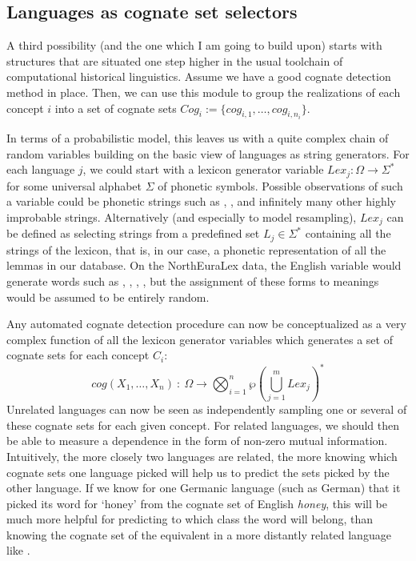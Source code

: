 \subsection{Languages as cognate set selectors}
A third possibility (and the one which I am going to build upon) starts with structures that are situated one step higher in the usual toolchain of computational historical linguistics. Assume we have a good cognate detection method in place. Then, we can use this module to group the realizations of each concept $i$ into a set of cognate sets $Cog_i := \{cog_{i,1}, \dots, cog_{i,n_{i}}\}$.

In terms of a probabilistic model, this leaves us with a quite complex chain of random variables building on the basic view of languages as string generators. For each language $j$, we could start with a lexicon generator variable $Lex_j \colon \Omega \rightarrow \Sigma^*$ for some universal alphabet $\Sigma$ of phonetic symbols. Possible observations of such a variable could be phonetic strings such as \UIPA{[æææ]}, \UIPA{[ktkəəŋ]}, and infinitely many other highly improbable strings. Alternatively (and especially to model resampling), $Lex_j$ can be defined as selecting strings from a predefined set $L_j \in \Sigma^*$ containing all the strings of the lexicon, that is, in our case, a phonetic representation of all the lemmas in our database. On the NorthEuraLex data, the English variable would generate words such as \UIPA{[taʊn]}, \UIPA{[fiːvə]}, \UIPA{[hɛvɪ]}, \UIPA{[aɪ]}, but the assignment of these forms to meanings would be assumed to be entirely random.

Any automated cognate detection procedure can now be conceptualized as a very complex function of all the lexicon generator variables which generates a set of cognate sets for each concept $C_i$:
\begin{equation}
 cog(X_1,\dots,X_n)\ \colon\ \Omega \rightarrow \bigotimes_{i = 1}^{n} \wp\left(\bigcup_{j=1}^{m} Lex_j\right)^*
\end{equation}
Unrelated languages can now be seen as independently sampling one or several of these cognate sets for each given concept. For related languages, we should then be able to measure a dependence in the form of non-zero mutual information. Intuitively, the more closely two languages are related, the more knowing which cognate sets one language picked will help us to predict the sets picked by the other language. If we know for one Germanic language (such as German) that it picked its word for `honey' from the cognate set of English \textit{honey}, this will be much more helpful for predicting to which class the  word will belong, than knowing the cognate set of the equivalent in a more distantly related language like .

